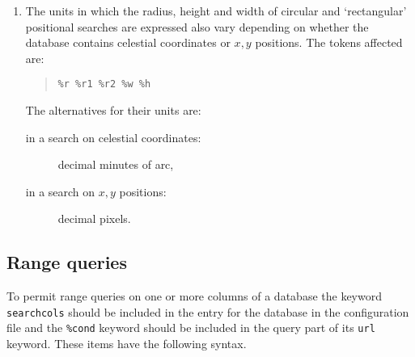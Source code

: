\documentclass[twoside,11pt]{article}
\renewcommand{\_}{\texttt{\symbol{95}}}
\begin{document}
\begin{enumerate}
  \item The units in which the radius, height and width of circular and
   `rectangular' positional searches are expressed also vary depending
   on whether the database contains celestial coordinates or $x,y$\/
   positions.  The tokens affected are:

  \begin{quote}
   {\tt \%r \%r1 \%r2 \%w \%h}
  \end{quote}

   The alternatives for their units are:

  \begin{description}

    \item[in a search on celestial coordinates:] decimal minutes of arc,

    \item[in a search on $x,y$\/ positions:] decimal pixels.

  \end{description}

\end{enumerate}

\subsection{\label{RANGE_R}Range queries}

To permit range queries on one or more columns of a database the keyword
{\tt search\_cols} should be included in the entry for the database in
the configuration file and the {\tt \%cond} keyword should be included
in the query part of its {\tt url} keyword.  These items have the
following syntax.
\end{document}
